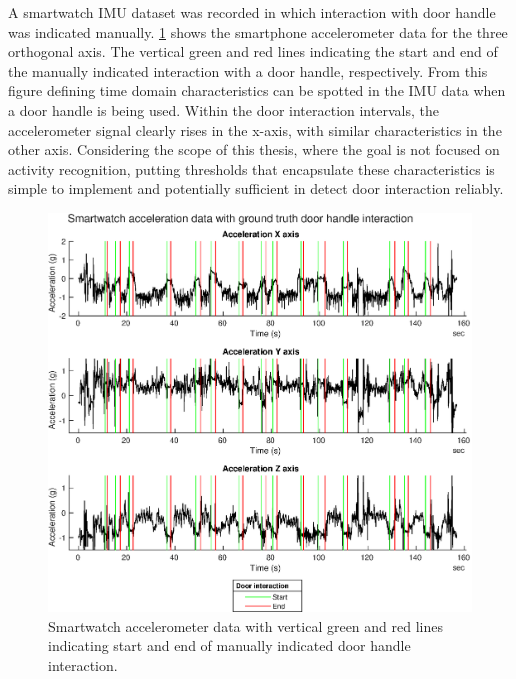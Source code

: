 A smartwatch \ac{IMU} dataset was recorded in which interaction with door handle was indicated manually.
\cref{fig:smartwatch_acc_with_gt_door_and_door_detect} shows the smartphone accelerometer data for the three orthogonal axis. The vertical green and red lines indicating the start and end of the manually indicated interaction with a door handle, respectively. From this figure defining time domain characteristics can be spotted in the \ac{IMU} data when a door handle is being used. Within the door interaction intervals, the accelerometer signal clearly rises in the x-axis, with similar characteristics in the other axis.  Considering the scope of this thesis, where the goal is not focused on activity recognition, putting thresholds that encapsulate these characteristics is simple to implement and potentially sufficient in detect door interaction reliably.

\begin{figure}[H]
	\centering
	\includegraphics[width=0.8\linewidth]{images/20201123_1010_Acceleration_Z_axis}
	\setlength{\belowcaptionskip}{-20pt}
	\caption{Smartwatch accelerometer data with vertical green and red lines indicating start and end of manually indicated door handle interaction.}
	\label{fig:smartwatch_acc_with_gt_door_and_door_detect}
\end{figure}


